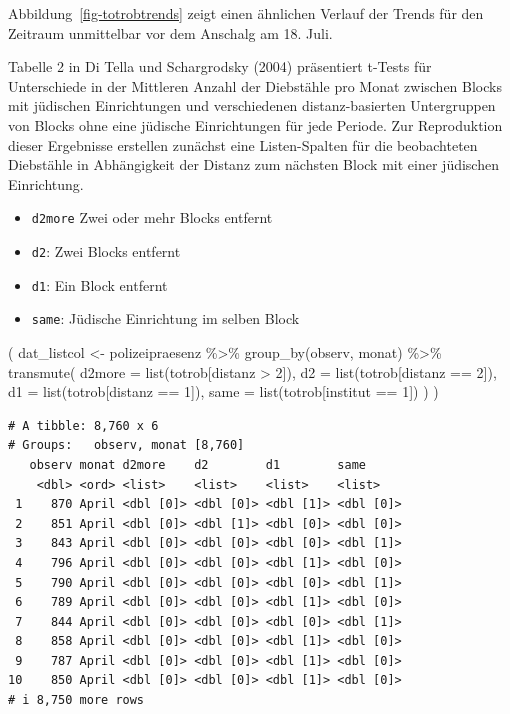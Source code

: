 \documentclass[
  a4paper,
  DIV=11,
  oneside]{scrreprt}
\newenvironment{Shaded}{\begin{snugshade}}{\end{snugshade}}
\newcommand{\AttributeTok}[1]{\textcolor[rgb]{0.40,0.45,0.13}{#1}}
\newcommand{\DecValTok}[1]{\textcolor[rgb]{0.68,0.00,0.00}{#1}}
\newcommand{\FunctionTok}[1]{\textcolor[rgb]{0.28,0.35,0.67}{#1}}
\newcommand{\NormalTok}[1]{\textcolor[rgb]{0.00,0.23,0.31}{#1}}
\newcommand{\OtherTok}[1]{\textcolor[rgb]{0.00,0.23,0.31}{#1}}
\newcommand{\SpecialCharTok}[1]{\textcolor[rgb]{0.37,0.37,0.37}{#1}}
\providecommand{\tightlist}{%
  \setlength{\itemsep}{0pt}\setlength{\parskip}{0pt}}\usepackage{longtable,booktabs,array}
\begin{document}
Abbildung~\ref{fig-totrobtrends} zeigt einen ähnlichen Verlauf der
Trends für den Zeitraum unmittelbar vor dem Anschalg am 18. Juli.

Tabelle 2 in Di Tella und Schargrodsky (2004) präsentiert t-Tests für
Unterschiede in der Mittleren Anzahl der Diebstähle pro Monat zwischen
Blocks mit jüdischen Einrichtungen und verschiedenen distanz-basierten
Untergruppen von Blocks ohne eine jüdische Einrichtungen für jede
Periode. Zur Reproduktion dieser Ergebnisse erstellen zunächst eine
Listen-Spalten für die beobachteten Diebstähle in Abhängigkeit der
Distanz zum nächsten Block mit einer jüdischen Einrichtung.

\begin{itemize}
\tightlist
\item
  \texttt{d2more} Zwei oder mehr Blocks entfernt
\item
  \texttt{d2}: Zwei Blocks entfernt
\item
  \texttt{d1}: Ein Block entfernt
\item
  \texttt{same}: Jüdische Einrichtung im selben Block
\end{itemize}

\begin{Shaded}
\begin{Highlighting}[]
\NormalTok{(}
\NormalTok{  dat\_listcol }\OtherTok{\textless{}{-}}\NormalTok{ polizeipraesenz }\SpecialCharTok{\%\textgreater{}\%} 
    \FunctionTok{group\_by}\NormalTok{(observ, monat) }\SpecialCharTok{\%\textgreater{}\%}
    \FunctionTok{transmute}\NormalTok{(}
      \AttributeTok{d2more =} \FunctionTok{list}\NormalTok{(totrob[distanz }\SpecialCharTok{\textgreater{}} \DecValTok{2}\NormalTok{]),}
      \AttributeTok{d2 =} \FunctionTok{list}\NormalTok{(totrob[distanz }\SpecialCharTok{==} \DecValTok{2}\NormalTok{]),}
      \AttributeTok{d1 =} \FunctionTok{list}\NormalTok{(totrob[distanz }\SpecialCharTok{==} \DecValTok{1}\NormalTok{]),}
      \AttributeTok{same =} \FunctionTok{list}\NormalTok{(totrob[institut }\SpecialCharTok{==} \DecValTok{1}\NormalTok{])}
\NormalTok{    )}
\NormalTok{)}
\end{Highlighting}
\end{Shaded}

\begin{verbatim}
# A tibble: 8,760 x 6
# Groups:   observ, monat [8,760]
   observ monat d2more    d2        d1        same     
    <dbl> <ord> <list>    <list>    <list>    <list>   
 1    870 April <dbl [0]> <dbl [0]> <dbl [1]> <dbl [0]>
 2    851 April <dbl [0]> <dbl [1]> <dbl [0]> <dbl [0]>
 3    843 April <dbl [0]> <dbl [0]> <dbl [0]> <dbl [1]>
 4    796 April <dbl [0]> <dbl [0]> <dbl [1]> <dbl [0]>
 5    790 April <dbl [0]> <dbl [0]> <dbl [0]> <dbl [1]>
 6    789 April <dbl [0]> <dbl [0]> <dbl [1]> <dbl [0]>
 7    844 April <dbl [0]> <dbl [0]> <dbl [0]> <dbl [1]>
 8    858 April <dbl [0]> <dbl [0]> <dbl [1]> <dbl [0]>
 9    787 April <dbl [0]> <dbl [0]> <dbl [1]> <dbl [0]>
10    850 April <dbl [0]> <dbl [0]> <dbl [1]> <dbl [0]>
# i 8,750 more rows
\end{verbatim}
\end{document}
